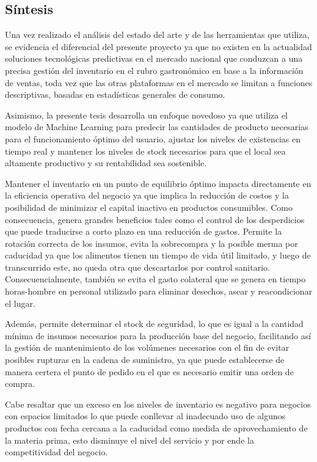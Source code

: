 \FloatBarrier

\subsection{Síntesis}\label{sec:sintesis-estado}

Una vez realizado el análisis del estado del arte y de las herramientas que utiliza, se evidencia el diferencial del presente proyecto ya que no existen en la actualidad soluciones tecnológicas predictivas en el mercado nacional que conduzcan a una precisa gestión del inventario en el rubro gastronómico en base a la información de ventas, toda vez que las otras plataformas en el mercado se limitan a funciones descriptivas, basadas en estadísticas generales de consumo.

Asimismo, la presente tesis desarrolla un enfoque novedoso ya que utiliza el modelo de Machine Learning para predecir las cantidades de producto necesarias para el funcionamiento óptimo del usuario, ajustar los niveles de existencias en tiempo real y mantener los niveles de stock necesarios para que el local sea altamente productivo y su rentabilidad sea sostenible.

Mantener el inventario en un punto de equilibrio óptimo impacta directamente en la eficiencia operativa del negocio ya que implica la reducción de costos y la posibilidad de minimizar el capital inactivo en productos consumibles. Como consecuencia, genera grandes beneficios tales como el control de los desperdicios que puede traducirse a corto plazo en una reducción de gastos. Permite la rotación correcta de los insumos, evita la sobrecompra y la posible merma por caducidad ya que los alimentos tienen un tiempo de vida útil limitado, y luego de transcurrido este, no queda otra que descartarlos por control sanitario. Consecuencialmente, también se evita el gasto colateral que se genera en tiempo horas-hombre en personal utilizado para eliminar desechos, asear y reacondicionar el lugar.

Además, permite determinar el stock de seguridad, lo que es igual a la cantidad mínima de insumos necesarios para la producción base del negocio, facilitando así la gestión de mantenimiento de los volúmenes necesarios con el fin de evitar posibles rupturas en la cadena de suministro, ya que puede establecerse de manera certera el punto de pedido en el que es necesario emitir una orden de compra. 

Cabe resaltar que un exceso en los niveles de inventario es negativo para negocios con espacios limitados lo que puede conllevar al inadecuado uso de algunos productos con fecha cercana a la caducidad como medida de aprovechamiento de la materia prima, esto disminuye el nivel del servicio y por ende la competitividad del negocio.

